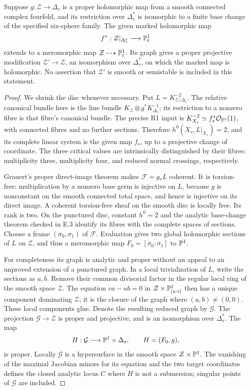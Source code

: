 \begin{proposition}
Suppose $g:\mathcal Z\to\Delta_s$ is a proper holomorphic map
from a smooth connected complex fourfold, and its restriction
over $\Delta_s^*$ is
isomorphic to a finite base change of the specified six-sphere
family. The given marked holomorphic map
\[
 f^*:\mathcal Z|_{\Delta_s^*}\longrightarrow\mathbb P^1_t
\]
extends to a meromorphic map $\mathcal Z\dashrightarrow\mathbb P^1_t$.
Its graph gives a proper projective modification
$\mathcal Z'\to\mathcal Z$, an isomorphism over
$\Delta_s^*$, on which the marked map is holomorphic.
No assertion that $\mathcal Z'$ is smooth or semistable is
included in this statement.
\end{proposition}
\begin{proof}
We shrink the disc whenever necessary. Put
$L=K_{\mathcal Z/\Delta_s}^{-2}$. The relative canonical
bundle here is the line bundle
$K_{\mathcal Z}\otimes g^*K_{\Delta_s}^{-1}$; its
restriction to a nonzero fibre is that fibre's canonical bundle.
The precise R1 input is
$K_{X_s}^{-2}\simeq f_s^*\mathcal O_{\mathbb P^1}(1)$,
with connected fibres and no further sections. Therefore
$h^0(X_s,L|_{X_s})=2$, and its complete linear system is
the given map $f_s$, up to a projective change of coordinate.
The three critical values are intrinsically distinguished by
their fibres: multiplicity three, multiplicity four, and reduced
normal crossings, respectively.

Grauert's proper direct-image theorem
\citep[Section 6, Hauptsatz I]{Grauert60push} makes
$\mathcal F=g_*L$ coherent. It is torsion-free: multiplication
by a nonzero base germ is injective on $L$, because $g$ is
nonconstant on the smooth connected total space, and hence is injective on
its direct image. A coherent torsion-free sheaf on the smooth
disc is locally free. Its rank is two. On the punctured disc,
constant $h^0=2$ and the analytic base-change theorem checked
in E.3 identify its fibres with the complete spaces of sections.
Choose a frame $(\sigma_0,\sigma_1)$ of $\mathcal F$.
Evaluation gives two global holomorphic sections of $L$ on
$\mathcal Z$, and thus a meromorphic map
$F_0=[\sigma_0:\sigma_1]$ to $\mathbb P^1$.

For completeness its graph is analytic and proper without an
appeal to an unproved extension of a punctured graph. In a local
trivialization of $L$, write the sections as $a,b$. Remove their
common divisorial factor in the regular local ring of the smooth
space $\mathcal Z$. The equation
$v a-u b=0$ in $\mathcal Z\times\mathbb P^1_{[u:v]}$
then has a unique component dominating $\mathcal Z$; it is
the closure of the graph where $(a,b)\ne(0,0)$. These local
components glue. Denote the resulting reduced graph by
$\mathcal G$. The projection $\mathcal G\to\mathcal Z$
is proper and projective, and is an isomorphism over
$\Delta_s^*$. The map
\[
 H:\mathcal G\longrightarrow\mathbb P^1\times\Delta_s,
 \qquad H=(F_0,g),
\]
is proper. Locally $\mathcal G$ is a hypersurface in the smooth
space $\mathcal Z\times\mathbb P^1$. The vanishing of the maximal
Jacobian minors for its equation and the two target coordinates
defines the closed analytic locus $C$ where $H$ is not a
submersion; singular points of $\mathcal G$ are included.


\end{proof}
